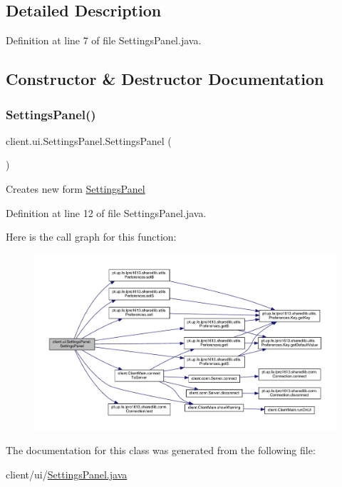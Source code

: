 \subsection{Detailed Description}


Definition at line 7 of file Settings\+Panel.\+java.



\subsection{Constructor \& Destructor Documentation}
\hypertarget{classclient_1_1ui_1_1_settings_panel_a95dfa76100b4d18863cd0b572c631ebf}{}\label{classclient_1_1ui_1_1_settings_panel_a95dfa76100b4d18863cd0b572c631ebf} 
\subsubsection{\texorpdfstring{Settings\+Panel()}{SettingsPanel()}}
{\footnotesize\ttfamily client.\+ui.\+Settings\+Panel.\+Settings\+Panel (\begin{DoxyParamCaption}{ }\end{DoxyParamCaption})}

Creates new form \hyperlink{classclient_1_1ui_1_1_settings_panel}{Settings\+Panel} 

Definition at line 12 of file Settings\+Panel.\+java.

Here is the call graph for this function\+:
\nopagebreak
\begin{figure}[H]
\begin{center}
\leavevmode
\includegraphics[width=350pt]{classclient_1_1ui_1_1_settings_panel_a95dfa76100b4d18863cd0b572c631ebf_cgraph}
\end{center}
\end{figure}


The documentation for this class was generated from the following file\+:\begin{DoxyCompactItemize}
\item 
client/ui/\hyperlink{_settings_panel_8java}{Settings\+Panel.\+java}\end{DoxyCompactItemize}
